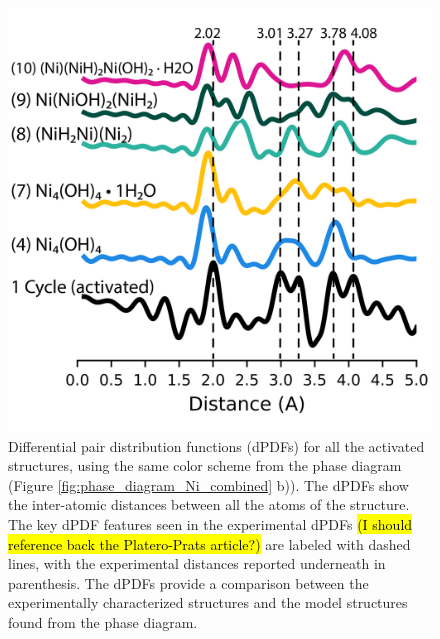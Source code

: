 \documentclass[journal=jctcce,manuscript=article]{achemso}
\begin{document}
\begin{figure}[H]
    \centering
    \includegraphics{zi-images/01-Ni-Graphics/2021-03-03-Ni-fixed-dPDFs-manuscript.png}
    \caption{Differential pair distribution functions (dPDFs) for all the activated structures, using the same color scheme from the  phase diagram (Figure \ref{fig:phase_diagram_Ni_combined} b)). The dPDFs show the inter-atomic distances between all the atoms of the structure. The key dPDF features seen in the experimental dPDFs \hl{(I should reference back the Platero-Prats article?)} are labeled with dashed lines, with the experimental distances reported underneath in parenthesis. The dPDFs provide a comparison between the experimentally characterized structures and the model structures found from the phase diagram.}
    \label{fig:dPDFs_TandP_fixed_Ni}
\end{figure}
\end{document}
